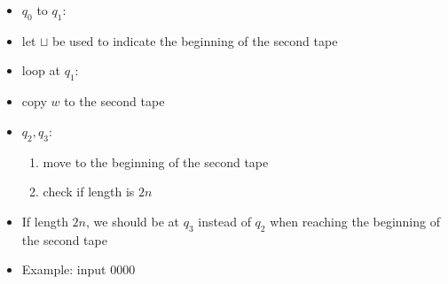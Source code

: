 \begin{frame}[allowframebreaks]
\begin{itemize}
\item $q_0$ to $q_1$:
  
\item [] let $\sqcup$ be used to indicate the beginning of the second
  tape
\item loop at $q_1$:
\item [] copy $w$ to the second tape
\item $q_2, q_3$: 
  \begin{enumerate}
  \item move to the beginning of the second tape
  \item check if length is $2n$
\end{enumerate}

\item If length $2n$, we should be at $q_3$
instead of $q_2$ when reaching the beginning of the
second tape

\item Example: input 0000


\end{itemize}
\end{frame}
